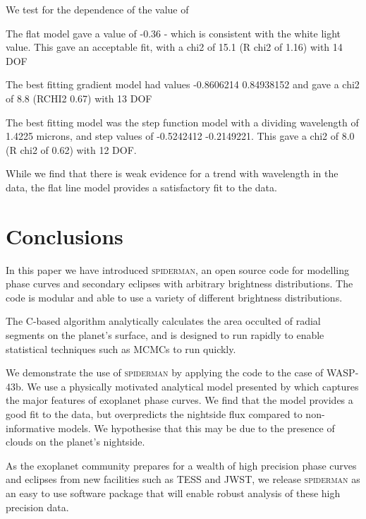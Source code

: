 \documentclass[a4paper,fleqn,usenatbib]{mnras}
\begin{document}
We test for the dependence of the value of \xi

The flat model gave a value of -0.36 - which is consistent with the white light value. This gave an acceptable fit, with a chi2 of 15.1 (R chi2 of 1.16) with 14 DOF

The best fitting gradient model had values -0.8606214   0.84938152 and gave a chi2 of 8.8 (RCHI2 0.67) with 13 DOF

The best fitting model was the step function model with a dividing wavelength of 1.4225 microns, and step values of -0.5242412 -0.2149221. This gave a chi2 of 8.0 (R chi2 of 0.62) with 12 DOF.

While we find that there is weak evidence for a trend with wavelength in the data, the flat line model provides a satisfactory fit to the data.

\section{Conclusions}\label{sec:conclusions}

In this paper we have introduced \textsc{spiderman}, an open source code for modelling phase curves and secondary eclipses with arbitrary brightness distributions. The code is modular and able to use a variety of different brightness distributions.

The C-based algorithm analytically calculates the area occulted of radial segments on the planet's surface, and is designed to run rapidly to enable statistical techniques such as MCMCs to run quickly.

We demonstrate the use of \textsc{spiderman} by applying the code to the case of WASP-43b. We use a physically motivated analytical model presented by \citet{Zhang2016} which captures the major features of exoplanet phase curves. We find that the model provides a good fit to the data, but overpredicts the nightside flux compared to non-informative models. We hypothesise that this may be due to the presence of clouds on the planet's nightside.

As the exoplanet community prepares for a wealth of high precision phase curves and eclipses from new facilities such as TESS and JWST, we release \textsc{spiderman} as an easy to use software package that will enable robust analysis of these high precision data.

\end{document}
